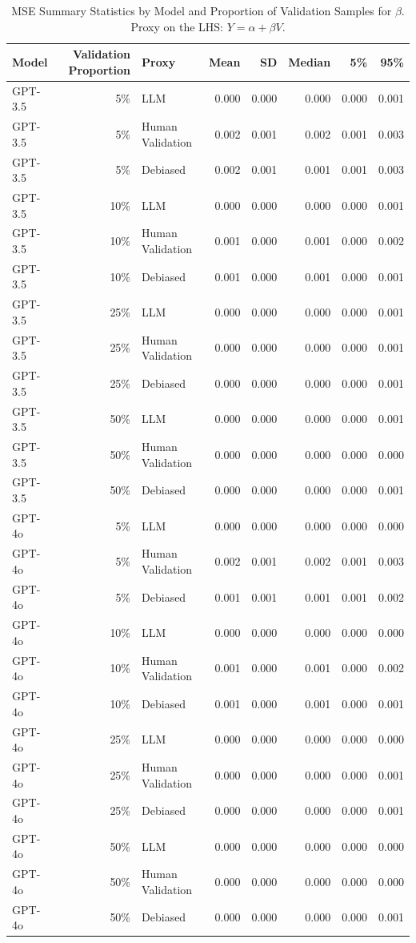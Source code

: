 \begin{table}

\caption{MSE Summary Statistics by Model and Proportion of Validation Samples for $\beta$. Proxy on the LHS: $Y = \alpha + \beta V$.}
\centering
\begin{tabular}[t]{lrlrrrrr}
\toprule
Model & Validation Proportion & Proxy & Mean & SD & Median & 5\% & 95\%\\
\midrule
GPT-3.5 & 5\% & LLM & 0.000 & 0.000 & 0.000 & 0.000 & 0.001\\
GPT-3.5 & 5\% & Human Validation & 0.002 & 0.001 & 0.002 & 0.001 & 0.003\\
GPT-3.5 & 5\% & Debiased & 0.002 & 0.001 & 0.001 & 0.001 & 0.003\\
GPT-3.5 & 10\% & LLM & 0.000 & 0.000 & 0.000 & 0.000 & 0.001\\
GPT-3.5 & 10\% & Human Validation & 0.001 & 0.000 & 0.001 & 0.000 & 0.002\\
GPT-3.5 & 10\% & Debiased & 0.001 & 0.000 & 0.001 & 0.000 & 0.001\\
GPT-3.5 & 25\% & LLM & 0.000 & 0.000 & 0.000 & 0.000 & 0.001\\
GPT-3.5 & 25\% & Human Validation & 0.000 & 0.000 & 0.000 & 0.000 & 0.001\\
GPT-3.5 & 25\% & Debiased & 0.000 & 0.000 & 0.000 & 0.000 & 0.001\\
GPT-3.5 & 50\% & LLM & 0.000 & 0.000 & 0.000 & 0.000 & 0.001\\
GPT-3.5 & 50\% & Human Validation & 0.000 & 0.000 & 0.000 & 0.000 & 0.000\\
GPT-3.5 & 50\% & Debiased & 0.000 & 0.000 & 0.000 & 0.000 & 0.001\\
GPT-4o & 5\% & LLM & 0.000 & 0.000 & 0.000 & 0.000 & 0.000\\
GPT-4o & 5\% & Human Validation & 0.002 & 0.001 & 0.002 & 0.001 & 0.003\\
GPT-4o & 5\% & Debiased & 0.001 & 0.001 & 0.001 & 0.001 & 0.002\\
GPT-4o & 10\% & LLM & 0.000 & 0.000 & 0.000 & 0.000 & 0.000\\
GPT-4o & 10\% & Human Validation & 0.001 & 0.000 & 0.001 & 0.000 & 0.002\\
GPT-4o & 10\% & Debiased & 0.001 & 0.000 & 0.001 & 0.000 & 0.001\\
GPT-4o & 25\% & LLM & 0.000 & 0.000 & 0.000 & 0.000 & 0.000\\
GPT-4o & 25\% & Human Validation & 0.000 & 0.000 & 0.000 & 0.000 & 0.001\\
GPT-4o & 25\% & Debiased & 0.000 & 0.000 & 0.000 & 0.000 & 0.001\\
GPT-4o & 50\% & LLM & 0.000 & 0.000 & 0.000 & 0.000 & 0.000\\
GPT-4o & 50\% & Human Validation & 0.000 & 0.000 & 0.000 & 0.000 & 0.000\\
GPT-4o & 50\% & Debiased & 0.000 & 0.000 & 0.000 & 0.000 & 0.001\\
\bottomrule
\end{tabular}
\end{table}

